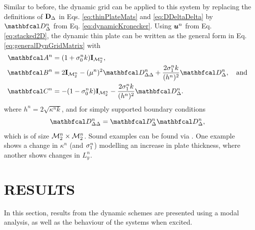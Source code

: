 \documentclass[fleqn]{jaes}
\def\SWcomment[#1]{\textcolor{blue}{#1}}
\begin{document}
Similar to before, the dynamic grid can be applied to this system by replacing the definitions of $\mathbf{D}_\Delta$ in Eqs. \eqref{eq:thinPlateMats} and \eqref{eq:DDeltaDelta} by $\DDDelta$ from Eq. \eqref{eq:dynamicKronecker}. Using $\boldsymbol{u}^n$ from Eq. \eqref{eq:stacked2D}, the dynamic thin plate can be written as the general form in Eq. \eqref{eq:generalDynGridMatrix} with
\begin{equation}\label{eq:thinPlateDynMatrix}
\begin{aligned}
    \AA &= (1+\sigma_0^nk)\I_\MtwoD, \\
    \BB &= 2\I_\MtwoD - (\mu^n)^2 \DDDeltaDelta + \frac{2\sigma_1^nk}{(h^n)^2}\DDDelta,\quad \text{and}\\
    \CC &= -(1-\sigma_0^nk)\I_\MtwoD - \frac{2\sigma_1^nk}{(h^n)^2}\DDDelta.
    \end{aligned}
\end{equation}
where $h^n = 2\sqrt{\kappa^n k}$, and for simply supported boundary conditions 
\begin{equation}\label{eq:4thOrder2D}
    \DDDeltaDelta = \DDDelta\DDDelta,
\end{equation}
which is of size ${\mathcal{M}_2^n} \times {\mathcal{M}_2^n}$. Sound examples can be found via \cite{soundExamples}. One example shows a change in $\kappa^n$ (and $\sigma_{1}^n$) modelling an increase in plate thickness, where another shows changes in $L_y^n$. 

\section{RESULTS}\label{sec:analysis}
In this section, results from the dynamic schemes are presented using a modal analysis, as well as the behaviour of the systems when excited.

\end{document}

